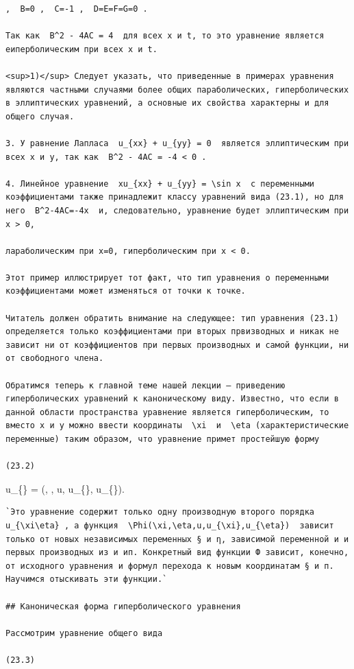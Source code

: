 \documentclass[
  ukrainian,
]{article}
\begin{document}
\begin{verbatim}
,  B=0 ,  C=-1 ,  D=E=F=G=0 .

Так как  B^2 - 4AC = 4  для всех x и t, то это уравнение является еиперболическим при всех x и t.

<sup>1)</sup> Следует указать, что приведенные в примерах уравнения являются частными случаями более общих параболических, гиперболических в эллиптических уравнений, а основные их свойства характерны и для общего случая.

3. У равнение Лапласа  u_{xx} + u_{yy} = 0  является эллиптическим при всех x и y, так как  B^2 - 4AC = -4 < 0 .

4. Линейное уравнение  xu_{xx} + u_{yy} = \sin x  с переменными коэффициентами также принадлежит классу уравнений вида (23.1), но для него  B^2-4AC=-4x  и, следовательно, уравнение будет эллиптическим при x > 0,

лараболическим при x=0, гиперболическим при x < 0.

Этот пример иллюстрирует тот факт, что тип уравнения о переменными коэффициентами может изменяться от точки к точке.

Читатель должен обратить внимание на следующее: тип уравнения (23.1) определяется только коэффициентами при вторых првизводных и никак не зависит ни от коэффициентов при первых производных и самой функции, ни от свободного члена.

Обратимся теперь к главной теме нашей лекции — приведению гиперболических уравнений к каноническому виду. Известно, что если в данной области пространства уравнение является гиперболическим, то вместо x и y можно ввести координаты  \xi  и  \eta (характеристические переменные) таким образом, что уравнение примет простейшую форму

(23.2)
\end{verbatim}

u\_\{\xi\eta\} = \Phi(\xi, \eta, u, u\_\{\xi\}, u\_\{\eta\}).

\begin{verbatim}
`Это уравнение содержит только одну производную второго порядка  u_{\xi\eta} , а функция  \Phi(\xi,\eta,u,u_{\xi},u_{\eta})  зависит только от новых независимых переменных § и η, зависимой переменной и и первых производных из и ип. Конкретный вид функции Ф зависит, конечно, от исходного уравнения и формул перехода к новым координатам § и п. Научимся отыскивать эти функции.`

## Каноническая форма гиперболического уравнения

Рассмотрим уравнение общего вида

(23.3)
\end{verbatim}
\end{document}
